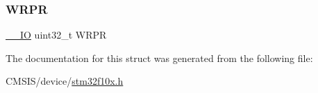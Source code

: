 \subsubsection{\texorpdfstring{WRPR}{WRPR}}
{\footnotesize\ttfamily \mbox{\hyperlink{core__sc300_8h_aec43007d9998a0a0e01faede4133d6be}{\+\_\+\+\_\+\+IO}} uint32\+\_\+t W\+R\+PR}



The documentation for this struct was generated from the following file\+:\begin{DoxyCompactItemize}
\item 
C\+M\+S\+I\+S/device/\mbox{\hyperlink{stm32f10x_8h}{stm32f10x.\+h}}\end{DoxyCompactItemize}
